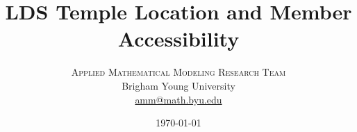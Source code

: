\documentclass[twoside,twocolumn]{article}
\renewcommand{\maketitlehookd}{%
\begin{abstract}
\noindent This paper uses various mathematical models to determine the best locations for LDS temples to be built within the United States in order to benefit the most members of the LDS church.
These models take into account the locations of current temples and the population density of members of the LDS church. 
The model associated with the Fermat-Weber problem is used to minimize the average distance from members to their nearest temple within the United States.
This investigation is followed by the Markov Chain Model.
This model accounts for the likelihood of a member attending one of the temples closest to them based off of their distance from and the busyness of each temple using a probabilistic approach.
\end{abstract}
}
\begin{document}
\usepackage{titling} %

\usepackage{hyperref} %

\usepackage{tikz} %
\usetikzlibrary{arrows} %

\usepackage{graphicx} %


\setlength{\droptitle}{-4\baselineskip} %

\pretitle{\begin{center}\Huge\bfseries} %
\posttitle{\end{center}} %
\title{LDS Temple Location and Member Accessibility} %
\author{%
\textsc{Applied Mathematical Modeling Research Team}\\[1ex] %
\normalsize Brigham Young University  \\ %
\normalsize \href{mailto:amm@math.byu.edu}{amm@math.byu.edu} %
}
\date{\today} %
\renewcommand{\maketitlehookd}{%
\begin{abstract}
\noindent This paper uses various mathematical models to determine the locations of future LDS temples within the United States by optimizing church member benefit.
The models use the locations of current temples and the population density of members of the LDS church across the United States.
We use the model associated with the Fermat-Weber problem to minimize the average distance from members to their nearest temple.
This investigation is followed by the Markov Chain Model, which uses a probabilistic approach and accounts for the likelihood of a member attending a nearby temple based off of its distance and busyness .
\end{abstract}
}
\end{document}
